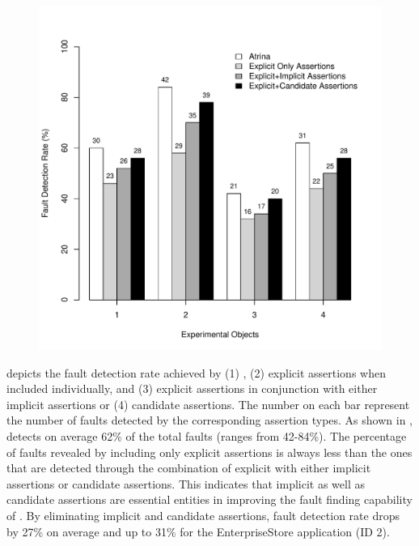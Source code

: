 \begin{figure}[!t]
  \centering
  \includegraphics[width=1\hsize]{r-scripts/assertionTypeFaultDetec}
  \vspace{-0.18in} 
  \vspace{-0.1in} 
  \label{Fig:assertionTypeFaultDetec} 
\end{figure}
  depicts the fault detection rate achieved by (1) \tool, (2) explicit assertions when included individually, and (3) explicit assertions in conjunction with either implicit assertions or (4) candidate assertions. The number on each bar represent the number of faults detected by the corresponding assertion types. As shown in , \tool detects on average 62\% of the total faults (ranges from 42-84\%).
The percentage of faults revealed by including only explicit assertions is always less than the ones that are detected through the combination of explicit with either implicit assertions or candidate assertions. This indicates that implicit as well as candidate assertions are essential entities in improving the fault finding capability of \tool. By eliminating implicit and candidate assertions, fault detection rate drops by 27\% on average and up to 31\% for the EnterpriseStore application (ID 2).

